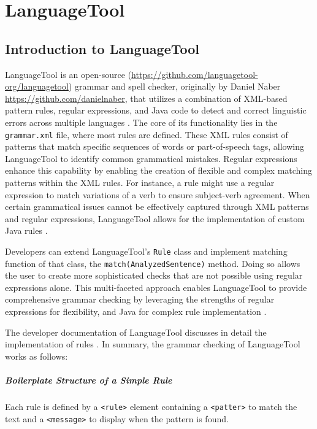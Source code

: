 \chapter{LanguageTool}
\label{language_tool}
\section{Introduction to LanguageTool}

LanguageTool is an open-source (\url{https://github.com/languagetool-org/languagetool}) grammar and spell checker, originally by Daniel Naber \url{https://github.com/danielnaber}, that utilizes a combination of XML-based pattern rules, regular expressions, and Java code to detect and correct linguistic errors across multiple languages \cite{about_languagetool}. The core of its functionality lies in the \texttt{grammar.xml} file, where most rules are defined. These XML rules consist of patterns that match specific sequences of words or part-of-speech tags, allowing LanguageTool to identify common grammatical mistakes. Regular expressions enhance this capability by enabling the creation of flexible and complex matching patterns within the XML rules. For instance, a rule might use a regular expression to match variations of a verb to ensure subject-verb agreement. When certain grammatical issues cannot be effectively captured through XML patterns and regular expressions, LanguageTool allows for the implementation of custom Java rules \cite{LanguageToolGitHub}. 

Developers can extend LanguageTool's \texttt{Rule} class and implement matching function of that class, the \texttt{match(AnalyzedSentence)} method. Doing so allows the user to create more sophisticated checks that are not possible using regular expressions alone. This multi-faceted approach enables LanguageTool to provide comprehensive grammar checking by leveraging the strengths of regular expressions for flexibility, and Java for complex rule implementation \cite{LanguageToolGitHub}.

The developer documentation of LanguageTool discusses in detail the implementation of rules \cite{LanguageToolDevDocs}. In summary, the grammar checking of LanguageTool works as follows:

\paragraph{Boilerplate Structure of a Simple Rule} Each rule is defined by a \texttt{<rule>} element containing a \texttt{<patter>} to match the text and a \texttt{<message>} to display when the pattern is found.

